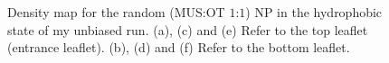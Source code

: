 \begin{figure}[p]
{		}\\%
		\,%
	\caption{Density map for the random (\acs{MUS}:\acs{OT} $1$:$1$) \acs{NP} in the hydrophobic state of my unbiased run. (a), (c) and (e) Refer to the top leaflet (entrance leaflet). (b), (d) and (f) Refer to the bottom leaflet.}%
	\label{fig:randomDensity}
\end{figure}
%
